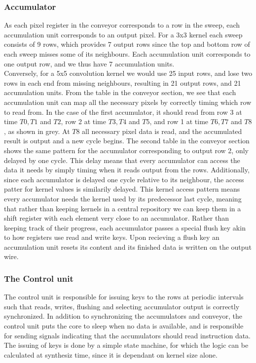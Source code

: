 \subsubsection{Accumulator}
As each pixel register in the conveyor corresponds to a row in the sweep, each accumulation unit corresponds to an output pixel.
For a 3x3 kernel each sweep consists of 9 rows, which provides 7 output rows since the top and bottom row of each sweep misses some of its neighbours.
Each accumulation unit corresponds to one output row, and we thus have 7 accumulation units.\\
Conversely, for a 5x5 convolution kernel we would use 25 input rows, and lose two rows in each end from missing neighbours, resulting in 21 output rows, and 21 accumulation units.
From the table in the conveyor section, we see that each accumulation unit can map all the necessary pixels by correctly timing which row to read from.
In the case of the first accumulator, it should read from row 3 at time $T0, T1$ and $T2$, row 2 at time $T3, T4$ and $T5$, and row 1 at time $T6, T7$ and $T8$, as shown in grey.
At $T8$ all necessary pixel data is read, and the accumulated result is output and a new cycle begins.
The second table in the conveyor section shows the same pattern for the accumulator corresponding to output row 2, only delayed by one cycle.
This delay means that every accumulator can access the data it needs by simply timing when it reads output from the rows.
Additionally, since each accumulator is delayed one cycle relative to its neighbour, the access patter for kernel values is similarily delayed.
This kernel access pattern means every accumulator needs the kernel used by its predecessor last cycle, meaning that rather than keeping kernels in a central repository we can keep them in a shift register with each element very close to an accumulator.
Rather than keeping track of their progress, each accumulator passes a special flush key akin to how registers use read and write keys. Upon recieving a flush key an accumulation unit resets its content and its finished data is written on the output wire.

\subsubsection{The Control unit}
The control unit is responsible for issuing keys to the rows at periodic intervals such that reads, writes, flushing and selecting accumulator output is correctly synchronized.
In addition to synchronizing the accumulators and conveyor, the control unit puts the core to sleep when no data is available, and is responsible for sending signals indicating that the accumulators should read instruction data.
The issuing of keys is done by a simple state machine, for which the logic can be calculated at synthesiz time, since it is dependant on kernel size alone. 

